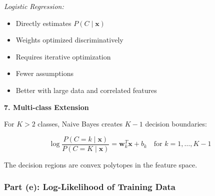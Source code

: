 \documentclass[12pt]{article}
\begin{document}
\begin{explanation}
\textit{Logistic Regression:}
\begin{itemize}
    \item Directly estimates $P(C \mid \mathbf{x})$
    \item Weights optimized discriminatively
    \item Requires iterative optimization
    \item Fewer assumptions
    \item Better with large data and correlated features
\end{itemize}

\textbf{7. Multi-class Extension}

For $K > 2$ classes, Naive Bayes creates $K-1$ decision boundaries:

\[
\log \frac{P(C = k \mid \mathbf{x})}{P(C = K \mid \mathbf{x})} = \mathbf{w}_k^T \mathbf{x} + b_k \quad \text{for } k = 1, \ldots, K-1
\]

The decision regions are convex polytopes in the feature space.
\end{explanation}

\subsubsection{Part (e): Log-Likelihood of Training Data}
\end{document}
